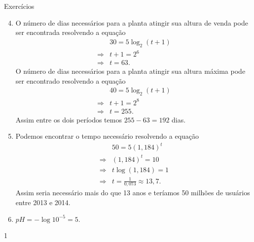 \begin{answer}{Exercícios}
{\exerciselist
\begin{enumerate}\setcounter{enumi}{3}
\item O número de dias necessários para a planta atingir sua altura de venda pode ser encontrada resolvendo a equação
\begin{align*}
&30 = 5\log_2 (t+1)\\
\Rightarrow &t+1 = 2^6\\
\Rightarrow &t = 63.
\end{align*}
O número de dias necessários para a planta atingir sua altura máxima pode ser encontrado resolvendo a equação
\begin{align*}
&40 = 5\log_2 (t+1)\\
\Rightarrow& t+1 = 2^8\\
\Rightarrow& t = 255.
\end{align*}
Assim entre os dois períodos temos $255-63 = 192$ dias.

\item Podemos encontrar o tempo necessário resolvendo a equação
\begin{align*}
&50 = 5(1{,}184)^t\\
\Rightarrow& (1{,}184)^t = 10\\
\Rightarrow& t\log(1{,}184) = 1\\
\Rightarrow& t = \frac{1}{0{,}073} \approx 13{,}
7.
\end{align*}
Assim seria necessário mais do que 13 anos e teríamos 50 milhões de usuários entre 2013 e 2014.

\item $pH = -\log 10^{-5}=5$.
\end{enumerate}
}{1}
\end{answer}
\clearmargin

